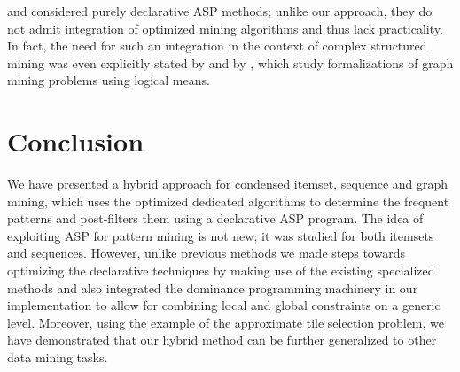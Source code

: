\textcite{DBLP:conf/lpnmr/Jarvisalo11} and \textcite{DBLP:conf/ijcai/GebserGQ0S16} considered purely declarative ASP methods; unlike our approach, they do not admit integration of optimized mining algorithms and thus %
lack 
practicality. In fact, the need for such an integration in the context of complex structured mining was even explicitly stated
by \textcite{query_mining_ilp} and by \textcite{KR_Graphs}, which study formalizations of graph mining problems using logical means. 





\section{Conclusion}\label{sec:conc}

We have presented a hybrid approach for condensed itemset, sequence and graph mining, which uses the optimized dedicated algorithms to determine the frequent patterns and post-filters them using a declarative ASP program. The idea of exploiting ASP for pattern mining is not new; it was studied for both itemsets and sequences. However, unlike previous methods we made steps towards optimizing the declarative techniques by making use of the existing specialized methods and also integrated the dominance programming machinery in our implementation to allow for combining local and global constraints on a generic level. Moreover, using the example of the approximate tile selection problem, we have demonstrated that our hybrid method can be further generalized to other data mining tasks.


